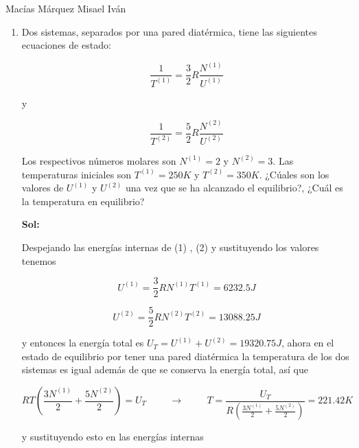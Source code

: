 \documentclass[12pt,a4paper]{article}
\begin{document}
Macías Márquez Misael Iván

\begin{enumerate}






\item Dos sistemas, separados por una pared diatérmica, tiene las siguientes ecuaciones de estado:

\begin{equation}
    \frac{1}{T^{(1)}} = \frac{3}{2}R \frac{N^{(1)}}{U^{(1)}}
\end{equation}

y

\begin{equation}
    \frac{1}{T^{(2)}} = \frac{5}{2} R \frac{N^{(2)}}{U^{(2)}}
\end{equation}

Los respectivos números molares son $N^{(1)}=  2 $ y $N^{(2)} = 3$. Las temperaturas iniciales son $T^{(1)} = 250 K$ y $T^{(2)} = 350 K$. ¿Cúales son los valores de $U^{(1)}$ y $U^{(2)}$ una vez que se ha alcanzado el equilibrio?, ¿Cuál es la temperatura en equilibrio?

\textbf{Sol:}

Despejando las energías internas de (1) , (2) y sustituyendo los valores tenemos

\begin{equation*}
    U^{(1)} = \frac{3}{2}R N^{(1)} T^{(1)} = 6232.5 J
\end{equation*}

\begin{equation*}
    U^{(2)} = \frac{5}{2} R N^{(2)} T^{(2)} = 13088.25 J
\end{equation*}

y entonces la energía total es $U_T = U^{(1)} + U^{(2)} = 19320.75 J$, ahora en el estado de equilibrio por tener una pared diatérmica la temperatura de los dos sistemas es igual además de que se conserva la energía total, así que

\begin{equation*}
    R T \left( \frac{3N^{(1)}}{2} + \frac{5 N^{(2)}}{2}\right) = U_T \hspace{1cm} \rightarrow \hspace{1cm} T = \frac{U_T}{R\left( \frac{3N^{(1)}}{2} + \frac{5 N^{(2)}}{2}\right) } = 221.42 K
\end{equation*}

y sustituyendo esto en las energías internas


\end{enumerate}
\end{document}
